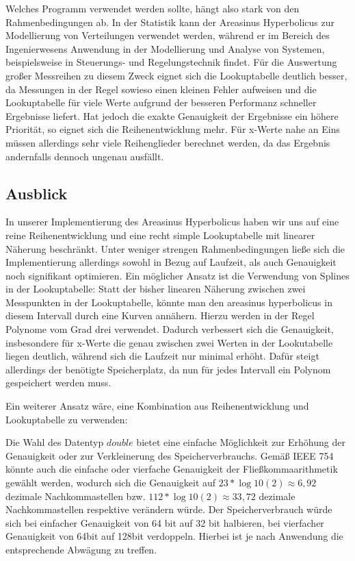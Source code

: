 \documentclass[course=erap] {aspdoc}
\begin{document}
    Welches Programm verwendet werden sollte, hängt also stark von den Rahmenbedingungen ab. 
    In der Statistik kann der Areasinus Hyperbolicus zur Modellierung von Verteilungen verwendet werden, während er im Bereich des Ingenierwesens Anwendung in der Modellierung und Analyse von Systemen, beispielsweise in Steuerungs- und Regelungstechnik findet. Für die Auswertung großer Messreihen zu diesem Zweck eignet sich die Lookuptabelle deutlich besser, da Messungen in der Regel sowieso einen kleinen Fehler aufweisen und die Lookuptabelle für viele Werte aufgrund der besseren Performanz schneller Ergebnisse liefert. 
    Hat jedoch die exakte Genauigkeit der Ergebnisse ein höhere Priorität, so eignet sich die Reihenentwicklung mehr. Für x-Werte nahe an Eins müssen allerdings sehr viele Reihenglieder berechnet werden, da das Ergebnis andernfalls dennoch ungenau ausfällt. 

    \subsection{Ausblick}

    In unserer Implementierung des Areasinus Hyperbolicus haben wir uns auf eine reine Reihenentwicklung und eine recht simple Lookuptabelle mit linearer Näherung beschränkt. Unter weniger strengen Rahmenbedingungen ließe sich die Implementierung allerdings sowohl in Bezug auf Laufzeit, als auch Genauigkeit noch signifikant optimieren. 
    Ein möglicher Ansatz ist die Verwendung von Splines in der Lookuptabelle: Statt der bisher linearen Näherung zwischen zwei Messpunkten in der Lookuptabelle, könnte man den areasinus hyperbolicus in diesem Intervall durch eine Kurven annähern. Hierzu werden in der Regel Polynome vom Grad drei verwendet. Dadurch verbessert sich die Genauigkeit, insbesondere für x-Werte die genau zwischen zwei Werten in der Lookutabelle liegen deutlich, während sich die Laufzeit nur minimal erhöht. Dafür steigt allerdings der benötigte Speicherplatz, da nun für jedes Intervall ein Polynom gespeichert werden muss.
    
    Ein weiterer Ansatz wäre, eine Kombination aus Reihenentwicklung und Lookuptabelle zu verwenden: 

    Die Wahl des Datentyp $double$ bietet eine einfache Möglichkeit zur Erhöhung der Genauigkeit oder zur Verkleinerung des Speicherverbrauchs.
    Gemäß IEEE 754 ~\cite{StandardforBinaryFloating} könnte auch die einfache oder vierfache Genauigkeit der
    Fließkommaarithmetik gewählt werden, wodurch sich die Genauigkeit auf $23*\log10(2) \approx 6,92$ dezimale Nachkommastellen
    bzw. $112*\log10(2) \approx 33,72$ dezimale Nachkommastellen respektive verändern würde.
    Der Speicherverbrauch würde sich bei einfacher Genauigkeit von 64 bit auf 32 bit halbieren, bei vierfacher Genauigkeit von 64bit auf 128bit verdoppeln.
    Hierbei ist je nach Anwendung die entsprechende Abwägung zu treffen.
\end{document}
